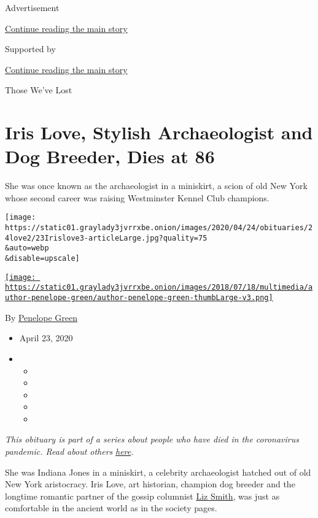 Advertisement

\protect\hyperlink{after-top}{Continue reading the main story}

Supported by

\protect\hyperlink{after-sponsor}{Continue reading the main story}

Those We've Lost

\hypertarget{iris-love-stylish-archaeologist-and-dog-breeder-dies-at-86}{%
\section{Iris Love, Stylish Archaeologist and Dog Breeder, Dies at
86}\label{iris-love-stylish-archaeologist-and-dog-breeder-dies-at-86}}

She was once known as the archaeologist in a miniskirt, a scion of old
New York whose second career was raising Westminster Kennel Club
champions.

\texttt{[image: https://static01.graylady3jvrrxbe.onion/images/2020/04/24/obituaries/24love2/23Irislove3-articleLarge.jpg?quality=75\\\&auto=webp\\\&disable=upscale]}

\href{https://www.nytimes3xbfgragh.onion/by/penelope-green}{\texttt{[image: https://static01.graylady3jvrrxbe.onion/images/2018/07/18/multimedia/author-penelope-green/author-penelope-green-thumbLarge-v3.png]}}

By \href{https://www.nytimes3xbfgragh.onion/by/penelope-green}{Penelope
Green}

\begin{itemize}
\item
  April 23, 2020
\item
  \begin{itemize}
  \item
  \item
  \item
  \item
  \item
  \end{itemize}
\end{itemize}

\emph{This obituary is part of a series about people who have died in
the coronavirus pandemic. Read about others}
\href{https://www.nytimes3xbfgragh.onion/series/people-who-have-died-of-the-coronavirus}{\emph{here}}\emph{.}

She was Indiana Jones in a miniskirt, a celebrity archaeologist hatched
out of old New York aristocracy. Iris Love, art historian, champion dog
breeder and the longtime romantic partner of the gossip columnist
\href{https://www.nytimes3xbfgragh.onion/2017/11/12/arts/liz-smith-dead.html}{Liz
Smith}, was just as comfortable in the ancient world as in the society
pages.

